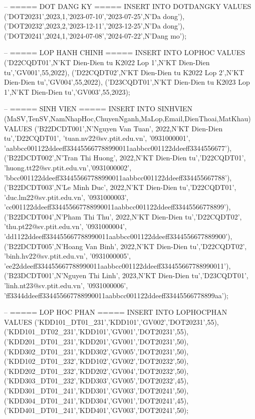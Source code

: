 \documentclass[13pt, a4paper]{article}
\begin{document}
\begin{sqlbox}
-- ===== DOT DANG KY =====
INSERT INTO DOTDANGKY VALUES
('DOT20231',2023,1,'2023-07-10','2023-07-25',N'Da dong'),
('DOT20232',2023,2,'2023-12-11','2023-12-25',N'Da dong'),
('DOT20241',2024,1,'2024-07-08','2024-07-22',N'Dang mo');

-- ===== LOP HANH CHINH =====
INSERT INTO LOPHOC VALUES
('D22CQDT01',N'KT Dien-Dien tu K2022 Lop 1',N'KT Dien-Dien tu','GV001',55,2022),
('D22CQDT02',N'KT Dien-Dien tu K2022 Lop 2',N'KT Dien-Dien tu','GV004',55,2022),
('D23CQDT01',N'KT Dien-Dien tu K2023 Lop 1',N'KT Dien-Dien tu','GV003',55,2023);

-- ===== SINH VIEN =====
INSERT INTO SINHVIEN (MaSV,TenSV,NamNhapHoc,ChuyenNganh,MaLop,Email,DienThoai,MatKhau) VALUES
('B22DCDT001',N'Nguyen Van Tuan', 2022,N'KT Dien-Dien tu','D22CQDT01',
 'tuan.nv22@sv.ptit.edu.vn', '0931000001',
 'aabbcc001122ddeeff334455667788990011aabbcc001122ddeeff3344556677'),
('B22DCDT002',N'Tran Thi Huong',  2022,N'KT Dien-Dien tu','D22CQDT01',
 'huong.tt22@sv.ptit.edu.vn','0931000002',
 'bbcc001122ddeeff334455667788990011aabbcc001122ddeeff334455667788'),
('B22DCDT003',N'Le Minh Duc',     2022,N'KT Dien-Dien tu','D22CQDT01',
 'duc.lm22@sv.ptit.edu.vn',  '0931000003',
 'cc001122ddeeff334455667788990011aabbcc001122ddeeff33445566778899'),
('B22DCDT004',N'Pham Thi Thu',    2022,N'KT Dien-Dien tu','D22CQDT02',
 'thu.pt22@sv.ptit.edu.vn',  '0931000004',
 'dd1122ddeeff334455667788990011aabbcc001122ddeeff3344556677889900'),
('B22DCDT005',N'Hoang Van Binh',  2022,N'KT Dien-Dien tu','D22CQDT02',
 'binh.hv22@sv.ptit.edu.vn', '0931000005',
 'ee22ddeeff334455667788990011aabbcc001122ddeeff334455667788990011'),
('B23DCDT001',N'Nguyen Thi Linh', 2023,N'KT Dien-Dien tu','D23CQDT01',
 'linh.nt23@sv.ptit.edu.vn', '0931000006',
 'ff3344ddeeff334455667788990011aabbcc001122ddeeff33445566778899aa');

-- ===== LOP HOC PHAN =====
INSERT INTO LOPHOCPHAN VALUES
('KDD101_DT01_231','KDD101','GV002','DOT20231',55),
('KDD101_DT02_231','KDD101','GV001','DOT20231',55),
('KDD201_DT01_231','KDD201','GV001','DOT20231',50),
('KDD302_DT01_231','KDD302','GV005','DOT20231',50),
('KDD102_DT01_232','KDD102','GV002','DOT20232',50),
('KDD202_DT01_232','KDD202','GV004','DOT20232',50),
('KDD303_DT01_232','KDD303','GV005','DOT20232',45),
('KDD301_DT01_241','KDD301','GV003','DOT20241',50),
('KDD304_DT01_241','KDD304','GV001','DOT20241',45),
('KDD401_DT01_241','KDD401','GV003','DOT20241',50);


\end{sqlbox}
\end{document}
